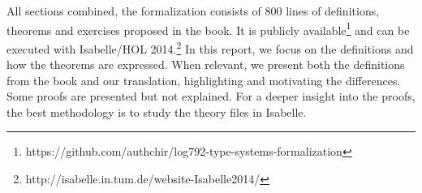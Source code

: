 All sections combined, the formalization consists of 800 lines of definitions, theorems and
exercises proposed in the book. It is publicly
available\footnote{https://github.com/authchir/log792-type-systems-formalization} and can be
executed with Isabelle/HOL 2014.\footnote{http://isabelle.in.tum.de/website-Isabelle2014/} In this
report, we focus on the definitions and how the theorems are expressed. When relevant, we present
both the definitions from the book and our translation, highlighting and motivating the differences.
Some proofs are presented but not explained. For a deeper insight into the proofs, the best
methodology is to study the theory files in Isabelle.


